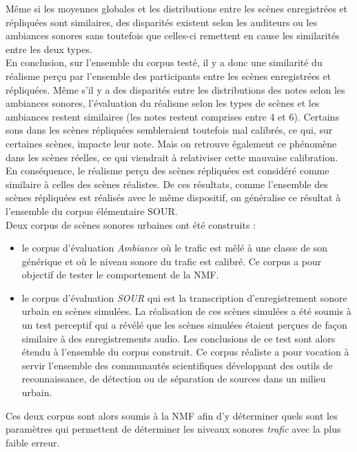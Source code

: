 Même si les moyennes globales et les distributions entre les scènes enregistrées et répliquées sont similaires, des disparités existent selon les auditeurs ou les ambiances sonores sans toutefois que celles-ci remettent en cause les similarités entre les deux types.\\


En conclusion, sur l'ensemble du corpus testé, il y a donc une similarité du réalisme perçu par l'ensemble des participants entre les scènes enregistrées et répliquées. Même s'il y a des disparités entre les distributions des notes selon les ambiances sonores, l'évaluation du réalisme selon les types de scènes et les ambiances restent similaires (les notes restent comprises entre 4 et 6). 
Certains sons dans les scènes répliquées sembleraient toutefois mal calibrés, ce qui, sur certaines scènes, impacte leur note. Mais on retrouve également ce phénomène dans les scènes réelles, ce qui viendrait à relativiser cette mauvaise calibration.
En conséquence, le réalisme perçu des scènes répliquées est considéré comme similaire à celles des scènes réalistes. 
De ces résultats, comme l'ensemble des scènes répliquées est réalisés avec le même dispositif, on généralise ce résultat à l'ensemble du corpus élémentaire SOUR.\\

Deux corpus de scènes sonores urbaines ont été construits :
\begin{itemize}
\item le corpus d'évaluation \textit{Ambiance} où le trafic est mêlé à une classe de son générique et où le niveau sonore du trafic est calibré.  Ce corpus a pour objectif de tester le comportement de la NMF.
\item le corpus d'évaluation \textit{SOUR} qui est la transcription d'enregistrement sonore urbain en scènes simulées. La réalisation de ces scènes simulées a été soumis à un test perceptif qui a révélé que les scènes simulées étaient perçues de façon similaire à des enregistrements audio. Les conclusions de ce test sont alors étendu à l'ensemble du corpus construit. Ce corpus réaliste a pour vocation à servir l'ensemble des communautés scientifiques développant des outils de reconnaissance, de détection ou de séparation de sources dans un milieu urbain. \\
\end{itemize}

Ces deux corpus sont alors soumis à la NMF afin d'y déterminer quels sont les paramètres qui permettent de déterminer les niveaux sonores \textit{trafic} avec la plus faible erreur.


